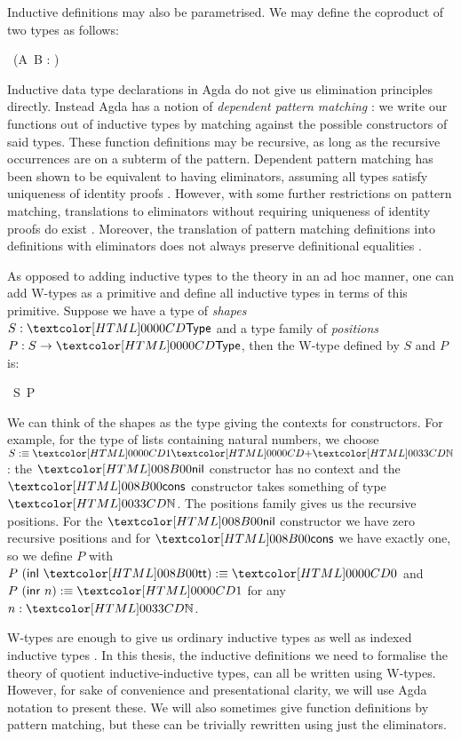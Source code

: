 Inductive definitions may also be parametrised. We may define the
coproduct of two types as follows:
\begin{datatype}{\sumty{\_}{\_}\ (A\ B : \Set)}{\Set}
   \\
\end{datatype}

Inductive data type declarations in Agda do not give us elimination
principles directly. Instead Agda has a notion of \emph{dependent
  pattern matching} \cite{Coquand1992}: we write our functions out of
inductive types by matching against the possible constructors of said
types. These function definitions may be recursive, as long as the
recursive occurrences are on a subterm of the pattern. Dependent
pattern matching has been shown to be equivalent to having
eliminators, assuming all types satisfy uniqueness of identity proofs
\cite{Goguen2006}. However, with some further restrictions on pattern
matching, translations to eliminators without requiring uniqueness of
identity proofs do exist \cite{Cockx2014}. Moreover, the translation
of pattern matching definitions into definitions with eliminators does
not always preserve definitional equalities \cite{McBride2006ii}.

As opposed to adding inductive types to the theory in an ad hoc
manner, one can add W-types as a primitive and define all inductive
types in terms of this primitive. Suppose we have a type of
\emph{shapes} $S : \Type$ and a type family of \emph{positions}
$P : S \to \Type$, then the W-type defined by $S$ and $P$ is:

\begin{datatype}{\wty\ S\ P}{\Type}
\end{datatype}

We can think of the shapes as the type giving the contexts for
constructors. For example, for the type of lists containing natural
numbers, we choose $S \ddefeq \coproduct{\unitty}{\natty}$: the
$\listnil$ constructor has no context and the $\listcons$ constructor
takes something of type $\natty$. The positions family gives us the
recursive positions. For the $\listnil$ constructor we have zero
recursive positions and for $\listcons$ we have exactly one, so we
define $P$ with $P\ (\inl\ \unitval) \ddefeq \emptyty$ and
$P\ (\inr\ n) \ddefeq \unitty$ for any $n : \natty$.

W-types are enough to give us ordinary inductive types as well as
indexed inductive types \cite{Morris2007}. In this thesis, the
inductive definitions we need to formalise the theory of quotient
inductive-inductive types, can all be written using W-types. However,
for sake of convenience and presentational clarity, we will use Agda
notation to present these. We will also sometimes give function
definitions by pattern matching, but these can be trivially rewritten
using just the eliminators.

